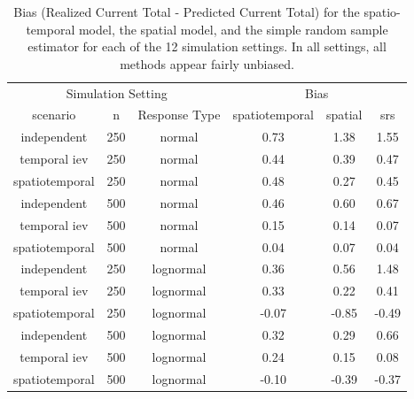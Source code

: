 \documentclass[]{interact}
\theoremstyle{plain}%
\theoremstyle{definition}
\theoremstyle{remark}
\begin{document}
\begin{table}[H]

\caption{\label{tab:simbiastab}Bias (Realized Current Total - Predicted Current Total) for the spatio-temporal model, the spatial model, and the simple random sample estimator for each of the 12 simulation settings. In all settings, all methods appear fairly unbiased.}
\centering
\begin{tabular}[t]{cccccc}
\toprule
\multicolumn{3}{c}{Simulation Setting} & \multicolumn{3}{c}{Bias} \\
\cmidrule(l{3pt}r{3pt}){1-3} \cmidrule(l{3pt}r{3pt}){4-6}
scenario & n & Response Type & spatiotemporal & spatial & srs\\
\midrule
independent & 250 & normal & 0.73 & 1.38 & 1.55\\
temporal iev & 250 & normal & 0.44 & 0.39 & 0.47\\
spatiotemporal & 250 & normal & 0.48 & 0.27 & 0.45\\
\midrule
independent & 500 & normal & 0.46 & 0.60 & 0.67\\
temporal iev & 500 & normal & 0.15 & 0.14 & 0.07\\
spatiotemporal & 500 & normal & 0.04 & 0.07 & 0.04\\
\midrule
independent & 250 & lognormal & 0.36 & 0.56 & 1.48\\
temporal iev & 250 & lognormal & 0.33 & 0.22 & 0.41\\
spatiotemporal & 250 & lognormal & -0.07 & -0.85 & -0.49\\
\midrule
independent & 500 & lognormal & 0.32 & 0.29 & 0.66\\
temporal iev & 500 & lognormal & 0.24 & 0.15 & 0.08\\
spatiotemporal & 500 & lognormal & -0.10 & -0.39 & -0.37\\
\bottomrule
\end{tabular}
\end{table}
\end{document}
